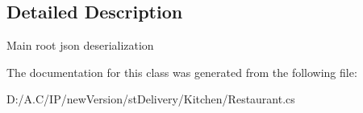 \subsection{Detailed Description}
Main root json deserialization 



The documentation for this class was generated from the following file\+:\begin{DoxyCompactItemize}
\item 
D\+:/\+A.\+C/\+I\+P/new\+Version/st\+Delivery/\+Kitchen/Restaurant.\+cs\end{DoxyCompactItemize}
